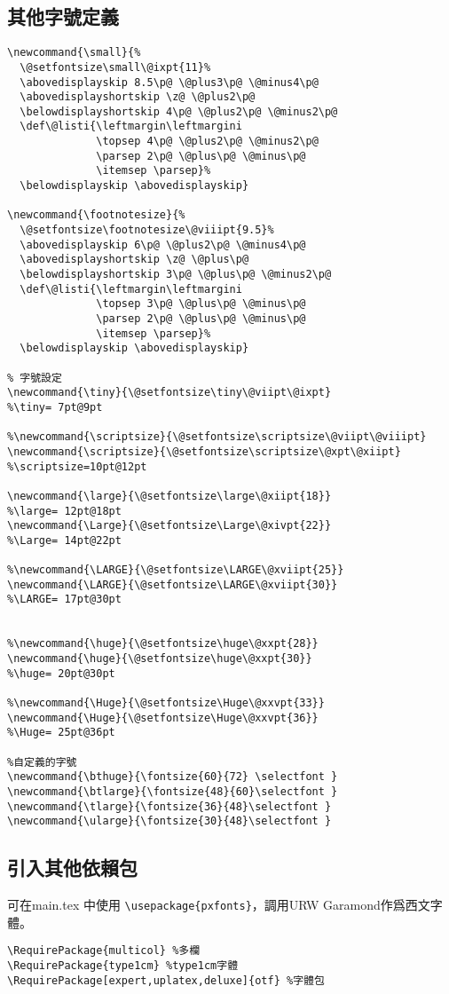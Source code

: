 \subsection{其他字號定義}
\begin{lstlisting}[firstnumber=137]
\newcommand{\small}{%
  \@setfontsize\small\@ixpt{11}%
  \abovedisplayskip 8.5\p@ \@plus3\p@ \@minus4\p@
  \abovedisplayshortskip \z@ \@plus2\p@
  \belowdisplayshortskip 4\p@ \@plus2\p@ \@minus2\p@
  \def\@listi{\leftmargin\leftmargini
              \topsep 4\p@ \@plus2\p@ \@minus2\p@
              \parsep 2\p@ \@plus\p@ \@minus\p@
              \itemsep \parsep}%
  \belowdisplayskip \abovedisplayskip}

\newcommand{\footnotesize}{%
  \@setfontsize\footnotesize\@viiipt{9.5}%
  \abovedisplayskip 6\p@ \@plus2\p@ \@minus4\p@
  \abovedisplayshortskip \z@ \@plus\p@
  \belowdisplayshortskip 3\p@ \@plus\p@ \@minus2\p@
  \def\@listi{\leftmargin\leftmargini
              \topsep 3\p@ \@plus\p@ \@minus\p@
              \parsep 2\p@ \@plus\p@ \@minus\p@
              \itemsep \parsep}%
  \belowdisplayskip \abovedisplayskip}

% 字號設定
\newcommand{\tiny}{\@setfontsize\tiny\@viipt\@ixpt}					    %\tiny= 7pt@9pt

%\newcommand{\scriptsize}{\@setfontsize\scriptsize\@viipt\@viiipt}
\newcommand{\scriptsize}{\@setfontsize\scriptsize\@xpt\@xiipt} %\scriptsize=10pt@12pt

\newcommand{\large}{\@setfontsize\large\@xiipt{18}}				      %\large= 12pt@18pt
\newcommand{\Large}{\@setfontsize\Large\@xivpt{22}}				      %\Large= 14pt@22pt

%\newcommand{\LARGE}{\@setfontsize\LARGE\@xviipt{25}}
\newcommand{\LARGE}{\@setfontsize\LARGE\@xviipt{30}}  			    %\LARGE= 17pt@30pt


%\newcommand{\huge}{\@setfontsize\huge\@xxpt{28}}
\newcommand{\huge}{\@setfontsize\huge\@xxpt{30}}    				    %\huge= 20pt@30pt

%\newcommand{\Huge}{\@setfontsize\Huge\@xxvpt{33}}
\newcommand{\Huge}{\@setfontsize\Huge\@xxvpt{36}}   				    %\Huge= 25pt@36pt

%自定義的字號
\newcommand{\bthuge}{\fontsize{60}{72} \selectfont }
\newcommand{\btlarge}{\fontsize{48}{60}\selectfont }
\newcommand{\tlarge}{\fontsize{36}{48}\selectfont }
\newcommand{\ularge}{\fontsize{30}{48}\selectfont }
\end{lstlisting}

\subsection{引入其他依賴包}
\par 可在main.tex 中使用 \verb+\usepackage{pxfonts}+，調用URW Garamond作爲西文字體。
\begin{lstlisting}[firstnumber=184]
\RequirePackage{multicol} %多欄
\RequirePackage{type1cm} %type1cm字體
\RequirePackage[expert,uplatex,deluxe]{otf} %字體包
\end{lstlisting}

